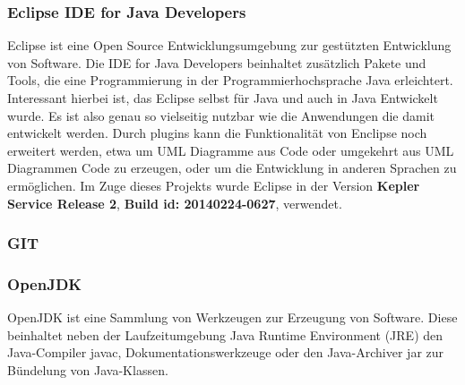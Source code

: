 \documentclass[12pt,a4paper,bibliography=totocnumbered,listof=totocnumbered]{scrartcl}
\begin{document}
\subsubsection{Eclipse IDE for Java Developers}
Eclipse ist eine Open Source Entwicklungsumgebung zur gestützten Entwicklung von Software. Die IDE for Java Developers beinhaltet zusätzlich Pakete und Tools, die eine Programmierung in der Programmierhochsprache Java erleichtert. Interessant hierbei ist, das Eclipse selbst für Java und auch in Java Entwickelt wurde. Es ist also genau so vielseitig nutzbar wie die Anwendungen die damit entwickelt werden. Durch plugins kann die Funktionalität von Enclipse noch erweitert werden, etwa um UML Diagramme aus Code oder umgekehrt aus UML Diagrammen Code zu erzeugen, oder um die Entwicklung in anderen Sprachen zu ermöglichen. Im Zuge dieses Projekts wurde Eclipse in der Version \textbf{Kepler Service Release 2}, \textbf{Build id: 20140224-0627}, verwendet.

\subsubsection{GIT}
\subsubsection{OpenJDK}
OpenJDK ist eine Sammlung von Werkzeugen zur Erzeugung von Software. Diese beinhaltet neben der Laufzeitumgebung Java Runtime Environment (JRE) den Java-Compiler javac, Dokumentationswerkzeuge oder den Java-Archiver jar zur Bündelung von Java-Klassen.
\end{document}
